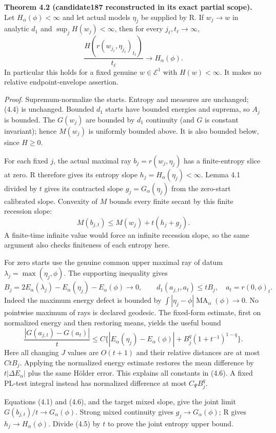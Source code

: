 \documentclass[
  11pt,
]{article}
\begin{document}
\textbf{Theorem 4.2 (candidate187 reconstructed in its exact partial
scope).} Let \(H_\alpha(\phi)<\infty\) and let actual models \(\eta_j\)
be supplied by R. If \(w_j\to w\) in analytic \(d_1\) and
\(\sup_j H(w_j)<\infty\), then for every \(j_\ell,t_\ell\to\infty\), \[
 \frac{H(r(w_{j_\ell},\eta_{j_\ell})_{t_\ell})}{t_\ell}
                     \longrightarrow H_\alpha(\phi). \tag{4.4}
\] In particular this holds for a fixed genuine \(w\in\mathcal E^1\)
with \(H(w)<\infty\). It makes no relative endpoint-envelope assertion.

\emph{Proof.} Supremum-normalize the starts. Entropy and measures are
unchanged; (4.4) is unchanged. Bounded \(d_1\) starts have bounded
energies and suprema, so \(A_j\) is bounded. The \(G(w_j)\) are bounded
by \(d_1\) continuity (and \(G\) is constant invariant); hence
\(M(w_j)\) is uniformly bounded above. It is also bounded below, since
\(H\geq0\).

For each fixed \(j\), the actual maximal ray \(b_j=r(w_j,\eta_j)\) has a
finite-entropy slice at zero. R therefore gives its entropy slope
\(h_j=H_\alpha(\eta_j)<\infty\). Lemma 4.1 divided by \(t\) gives its
contracted slope \(g_j=G_\alpha(\eta_j)\) from the zero-start calibrated
slope. Convexity of \(M\) bounds every finite secant by this finite
recession slope: \[ M(b_{j,t})\leq M(w_j)+t(h_j+g_j). \tag{4.5}\] A
finite-time infinite value would force an infinite recession slope, so
the same argument also checks finiteness of each entropy here.

For zero starts use the genuine common upper maximal ray of datum
\(\lambda_j=\max(\eta_j,\phi)\). The supporting inequality gives \[
 B_j=2E_\alpha(\lambda_j)-E_\alpha(\eta_j)-E_\alpha(\phi)\to0,
 \qquad d_1(a_{j,t},a_t)\leq tB_j,\quad a_t=r(0,\phi)_t.
\] Indeed the maximum energy defect is bounded by
\(\int|\eta_j-\phi|\operatorname{MA}_\alpha(\phi)\to0\). No pointwise
maximum of rays is declared geodesic. The fixed-form estimate, first on
normalized energy and then restoring means, yields the useful bound \[
 \frac{|G(a_{j,t})-G(a_t)|}{t}
 \leq C\{|E_\alpha(\eta_j)-E_\alpha(\phi)|
                  +B_j^q(1+t^{-1})^{1-q}\}. \tag{4.6}
\] Here all changing \(J\) values are \(O(t+1)\) and their relative
distances are at most \(CtB_j\). Applying the normalized energy estimate
restores the mean difference by \(t|\Delta E_\alpha|\) plus the same
Hölder error. This explains all constants in (4.6). A fixed PL-test
integral instead has normalized difference at most \(C_\Psi B_j^q\).

Equations (4.1) and (4.6), and the target mixed slope, give the joint
limit \(G(b_{j,t})/t\to G_\alpha(\phi)\). Strong mixed continuity gives
\(g_j\to G_\alpha(\phi)\); R gives \(h_j\to H_\alpha(\phi)\). Divide
(4.5) by \(t\) to prove the joint entropy upper bound.
\end{document}
